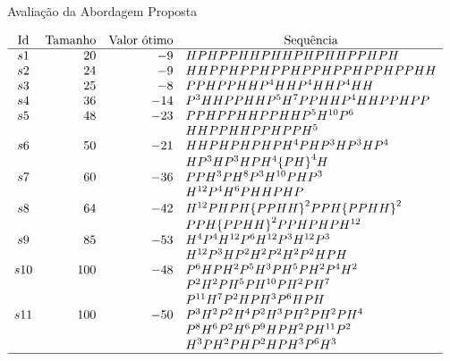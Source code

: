 \begin{frame}[allowframebreaks]{Avaliação da Abordagem Proposta}	
	

		
		\begin{table}[!htb]
			\begin{center}		
				\label{tab:sequences}
				{$\begin{array}{c r r l}
					\text{Id} & \text{Tamanho} &  \multicolumn{1}{c}{\text{Valor ótimo}} & \multicolumn{1}{c}{\text{Sequência}} \\ \hline
					s1 &20 &-9 & HPHPPHHPHHPHPHHPPHPH \\
					s2 &24 &-9 & HHPPHPPHPPHPPHPPHPPHPPHH \\
					s3 &25 &-8 & PPHPPHHP^4HHP^4HHP^4HH \\
					s4 &36 &-14 &  P^3HHPPHHP^5H^7PPHHP^4HHPPHPP\\
					s5 &48 &-23 &  PPHPPHHPPHHP^5H^{10}P^6 \\
					&   &    &  HHPPHHPPHPPH^5 \\
					s6 &50 &-21 &  HHPHPHPHPH^4PHP^3HP^3HP^4 \\
					&   &    & HP^3HP^3HPH^4{\{PH\}}^4H\\
					s7 &60 &-36 &  PPH^3PH^8P^3H^{10}PHP^3\\
					&   &    &  H^{12}P^4H^6PHHPHP\\
					s8 &64 &-42 &   H^{12}PHPH{\{PPHH\}}^2PPH{\{PPHH\}}^2\\
					&   &    &  PPH{\{PPHH\}}^2PPHPHPH^{12}\\
					s9  &85   &-53  & H^4P^4H^{12}P^6 H^{12} P^3 H^{12} P^3 \\
					&   &    &    H^{12} P^3  H P^2 H^2    P^2 H^2  P^2 H P H  \\
					s10  &100  &-48  &  P^6HPH^{2}P^5H^{3}PH^5PH^{2} P^4 H^{2} \\
					&   &    &   P^2  H^2 P  H^5  P H^{10} P H^{2} P H^{7}  \\
					&   &    &  P^{11} H^{7} P^2  H P   H^3  P^{6} H P H \\
					s11 &100  &-50  &  P^3H^{2}P^2H^{4}P^2H^{3}PH^{2} PH^{2}PH^{4} \\
					&   &    & P^8 H^6 P^{2} H^{6} P^{9} H P H^{2} P  H^{11} P^2  \\
					&   &    &H^3 P  H^{2} P H P^2  H P H^3 P^6 H^3\\ \hline
					\end{array}$}
			\end{center}
				\caption{Sequências que serão utilizadas para avaliar e comparar os resultados obtidos pela abordagem proposta}
		\end{table}

	
\end{frame}


